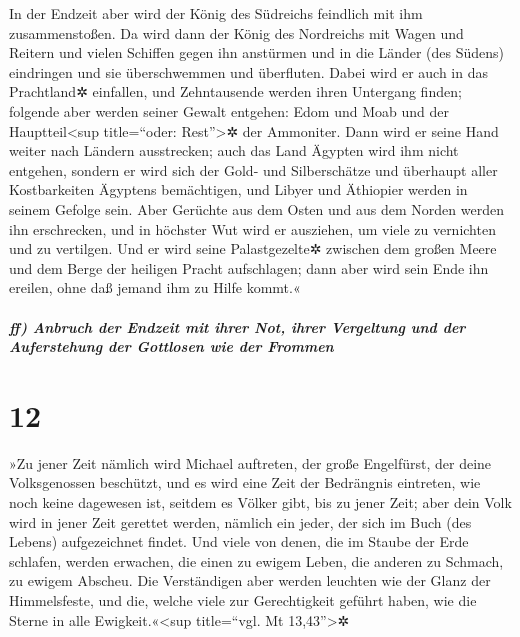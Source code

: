 In der Endzeit aber wird der König des Südreichs
feindlich mit ihm zusammenstoßen. Da wird dann der König des Nordreichs
mit Wagen und Reitern und vielen Schiffen gegen ihn anstürmen und in die
Länder (des Südens) eindringen und sie überschwemmen und überfluten.
Dabei wird er auch in das Prachtland✲ einfallen, und
Zehntausende werden ihren Untergang finden; folgende aber werden seiner
Gewalt entgehen: Edom und Moab und der Hauptteil\textless sup
title=``oder: Rest''\textgreater✲ der Ammoniter. Dann
wird er seine Hand weiter nach Ländern ausstrecken; auch das Land
Ägypten wird ihm nicht entgehen, sondern er wird sich der
Gold- und Silberschätze und überhaupt aller Kostbarkeiten Ägyptens
bemächtigen, und Libyer und Äthiopier werden in seinem Gefolge sein.
Aber Gerüchte aus dem Osten und aus dem Norden werden ihn
erschrecken, und in höchster Wut wird er ausziehen, um viele zu
vernichten und zu vertilgen. Und er wird seine
Palastgezelte✲ zwischen dem großen Meere und dem Berge der heiligen
Pracht aufschlagen; dann aber wird sein Ende ihn ereilen, ohne daß
jemand ihm zu Hilfe kommt.«

\hypertarget{ff-anbruch-der-endzeit-mit-ihrer-not-ihrer-vergeltung-und-der-auferstehung-der-gottlosen-wie-der-frommen}{%
\subparagraph{ff) Anbruch der Endzeit mit ihrer Not, ihrer Vergeltung
und der Auferstehung der Gottlosen wie der
Frommen}\label{ff-anbruch-der-endzeit-mit-ihrer-not-ihrer-vergeltung-und-der-auferstehung-der-gottlosen-wie-der-frommen}}

\hypertarget{section-11}{%
\section{12}\label{section-11}}

»Zu jener Zeit nämlich wird Michael auftreten, der große
Engelfürst, der deine Volksgenossen beschützt, und es wird eine Zeit der
Bedrängnis eintreten, wie noch keine dagewesen ist, seitdem es Völker
gibt, bis zu jener Zeit; aber dein Volk wird in jener Zeit gerettet
werden, nämlich ein jeder, der sich im Buch (des Lebens) aufgezeichnet
findet. Und viele von denen, die im Staube der Erde
schlafen, werden erwachen, die einen zu ewigem Leben, die anderen zu
Schmach, zu ewigem Abscheu. Die Verständigen aber werden
leuchten wie der Glanz der Himmelsfeste, und die, welche viele zur
Gerechtigkeit geführt haben, wie die Sterne in alle
Ewigkeit.«\textless sup title=``vgl. Mt 13,43''\textgreater✲

